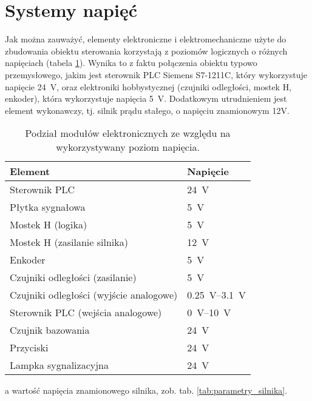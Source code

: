 \section{Systemy napięć}
\label{sec:ch3_systemy_napiec}

Jak można zauważyć, elementy elektroniczne i elektromechaniczne użyte do zbudowania obiektu sterowania korzystają z poziomów logicznych o różnych napięciach (tabela \ref{tab:poziomy_napiec}). Wynika to z faktu połączenia obiektu typowo przemysłowego, jakim jest sterownik PLC Siemens S7-1211C, który wykorzystuje napięcie \SI{24}{\volt}, oraz elektroniki hobbystycznej (czujniki odległości, mostek H, enkoder), która wykorzystuje napięcia \SI{5}{\volt}. Dodatkowym utrudnieniem jest element wykonawczy, tj. silnik prądu stałego, o napięciu znamionowym 12V.

\begin{table}[h]
    \centering
    \begin{threeparttable}
        \caption{Podział modułów elektronicznych ze względu na wykorzystywany poziom napięcia.}
        \label{tab:poziomy_napiec}
        
        \begin{tabularx}{0.6\textwidth}{l | l}
            \toprule
            Element & Napięcie \\
            \midrule
            Sterownik PLC & \SI{24}{\volt} \\
            Płytka sygnałowa & \SI{5}{\volt} \\
            Mostek H (logika) & \SI{5}{\volt} \\
            Mostek H (zasilanie silnika)\tnote{a} & \SI{12}{\volt} \\
            Enkoder & \SI{5}{\volt} \\
            Czujniki odległości (zasilanie) & \SI{5}{\volt} \\
            Czujniki odległości (wyjście analogowe) & \SIrange{0,25}{3,1}{\volt} \\
            Sterownik PLC (wejścia analogowe) & \SIrange{0}{10}{\volt} \\
            Czujnik bazowania & \SI{24}{\volt} \\
            Przyciski & \SI{24}{\volt} \\
            Lampka sygnalizacyjna & \SI{24}{\volt} \\
            \bottomrule
        \end{tabularx}
        
        \begin{tablenotes}
            \footnotesize
            \item[a] wartość napięcia znamionowego silnika, zob. tab. \ref{tab:parametry_silnika}.
        \end{tablenotes}
    \end{threeparttable}
\end{table}

